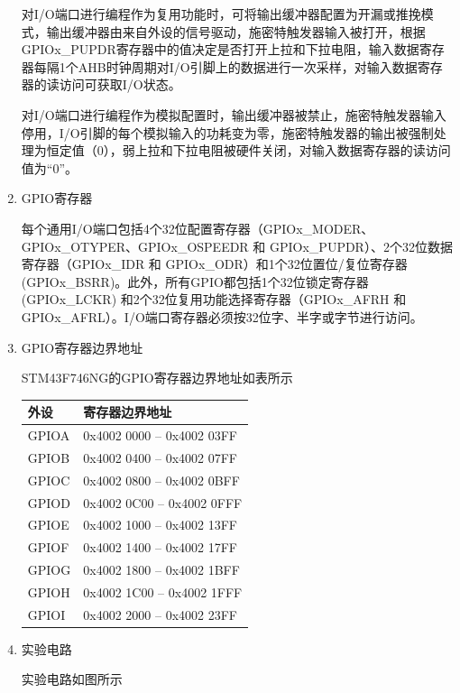 ﻿\documentclass[UTF8,12pt]{article}
\begin{document}
\begin{enumerate}
    对I/O端口进行编程作为复用功能时，可将输出缓冲器配置为开漏或推挽模式，输出缓冲器由来自外设的信号驱动，施密特触发器输入被打开，根据GPIOx\_PUPDR寄存器中的值决定是否打开上拉和下拉电阻，输入数据寄存器每隔1个AHB时钟周期对I/O引脚上的数据进行一次采样，对输入数据寄存器的读访问可获取I/O状态。

    对I/O端口进行编程作为模拟配置时，输出缓冲器被禁止，施密特触发器输入停用，I/O引脚的每个模拟输入的功耗变为零，施密特触发器的输出被强制处理为恒定值（0），弱上拉和下拉电阻被硬件关闭，对输入数据寄存器的读访问值为“0”。

    \item GPIO寄存器

    每个通用I/O端口包括4个32位配置寄存器（GPIOx\_MODER、GPIOx\_OTYPER、GPIOx\_OSPEEDR 和 GPIOx\_PUPDR）、2个32位数据寄存器（GPIOx\_IDR 和 GPIOx\_ODR）和1个32位置位/复位寄存器 (GPIOx\_BSRR)。此外，所有GPIO都包括1个32位锁定寄存器 (GPIOx\_LCKR) 和2个32位复用功能选择寄存器（GPIOx\_AFRH 和 GPIOx\_AFRL）。I/O端口寄存器必须按32位字、半字或字节进行访问。
    \item GPIO寄存器边界地址
    
    STM43F746NG的GPIO寄存器边界地址如表所示
    \begin{table}[!ht]
        \centering
        \begin{tabular}{|l|l|}
        \hline
            外设 & 寄存器边界地址  \\ \hline
            GPIOA & 0x4002 0000 – 0x4002 03FF  \\ \hline
            GPIOB & 0x4002 0400 – 0x4002 07FF  \\ \hline
            GPIOC & 0x4002 0800 – 0x4002 0BFF  \\ \hline
            GPIOD & 0x4002 0C00 – 0x4002 0FFF  \\ \hline
            GPIOE & 0x4002 1000 – 0x4002 13FF  \\ \hline
            GPIOF & 0x4002 1400 – 0x4002 17FF  \\ \hline
            GPIOG & 0x4002 1800 – 0x4002 1BFF  \\ \hline
            GPIOH & 0x4002 1C00 – 0x4002 1FFF  \\ \hline
            GPIOI & 0x4002 2000 – 0x4002 23FF  \\ \hline
        \end{tabular}
    \end{table}

    \item 实验电路
    
    实验电路如图所示


\end{enumerate}
\end{document}
